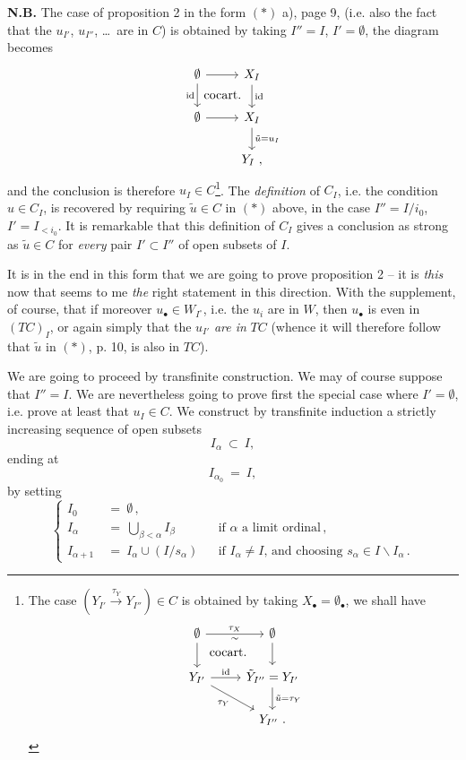 \documentclass[11pt]{article}
\newcommand{\printedpage}[1]{\marginpar{\footnotesize p.~#1}}
\newcommand{\msp}[1]{\marginpar{\footnotesize [#1]}}
\newcommand{\cocart}{\textup{cocart.}}
\begin{document}
\textbf{N.B.} The case of proposition 2 in the form $(*)$ a), page 9, (i.e. also the fact that the $u_{I'}$, $u_{I''}$, \dots\ are in $C$) is obtained by taking $I'' = I$, $I' = \emptyset$, the diagram becomes
\[
\begin{tikzcd}
\emptyset \arrow[r] \arrow[d, "\mathrm{id}"'] \arrow[dr, phantom, "\cocart"] & X_I \arrow[d, "\mathrm{id}"] \\
\emptyset \arrow[r] & X_I \arrow[d, "\tilde{u} = u_I"] \\
& Y_I\ ,
\end{tikzcd}
\]
and the conclusion is therefore $u_I \in C$\footnote{The case $(Y_{I'} \xrightarrow{\tau_Y} Y_{I''}) \in C$ is obtained by taking $X_{\bullet} = \emptyset_{\bullet}$, we shall have
\[
\begin{tikzcd}[ampersand replacement=\&]
\emptyset \arrow[r, "\tau_X", "\sim"'] \arrow[d] \arrow[dr, phantom, "\cocart"] \& \emptyset \arrow[d] \\
Y_{I'} \arrow[r, "\mathrm{id}"] \arrow[dr, "\tau_Y"'] \& \tilde{Y}_{I''} = Y_{I'} \arrow[d, "\tilde{u} = \tau_Y"] \\
\& Y_{I''}\ .
\end{tikzcd}
\]}. The \textit{definition} of $C_I$, i.e. the condition $u \in C_I$, is recovered by requiring $\tilde{u} \in C$ in $(*)$ above, in the case $I'' = I/i_0$, $I' = I_{<i_0}$. It is remarkable
\msp{page 11}
that this definition of $C_I$ gives a conclusion as strong as $\tilde{u} \in C$ for \textit{every} pair $I' \subset I''$ of open subsets of $I$.

It is in the end in this form that we are going to prove proposition 2 -- it is \textit{this} now that seems to me \textit{the} right statement in this direction. With the supplement, of course, that if moreover $u_{\bullet} \in W_{I^{\circ}}$, i.e. the $u_i$ are in $W$, then $u_{\bullet}$ is even in $(TC)_I$, or again
\printedpage{7}
simply that the $u_{I'}$ \textit{are in} $TC$ (whence it will therefore follow that $\tilde{u}$ in $(*)$, p. 10, is also in $TC$).

We are going to proceed by transfinite construction. We may of course suppose that $I'' = I$. We are nevertheless going to prove first the special case where $I' = \emptyset$, i.e. prove at least that $u_I \in C$. We construct by transfinite induction a strictly increasing sequence of open subsets
\[
I_{\alpha} \ \subset \ I,
\]
ending at
\[
I_{\alpha_0} \ = \ I,
\]
by setting
\[
\left\{
\begin{aligned}
I_0 \ &= \ \emptyset\,, \\
I_{\alpha} \ &= \ \textstyle\bigcup_{\beta < \alpha} I_{\beta} && \text{if $\alpha$ a limit ordinal}\,, \\
I_{\alpha+1} \ &= \ I_{\alpha} \cup (I/s_{\alpha}) && \text{if $I_{\alpha} \neq I$, and choosing $s_{\alpha} \in I \backslash I_{\alpha}$}\,.
\end{aligned}
\right.
\]
\end{document}
